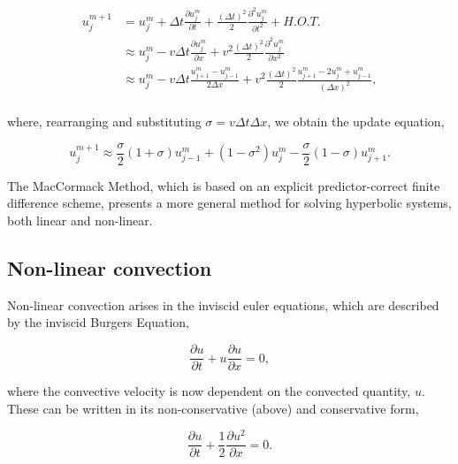 \documentclass[12pt]{article}
\begin{document}
\begin{align*}
u_j^{m+1} &= u_j^m + \Delta t \frac{\partial u_j^m}{\partial t} + \frac{(\Delta t)^2}{2}\frac{\partial^2 u_j^m}{\partial t^2} + H.O.T.\\[1em]
		  &\approx u_j^m - v\Delta t \frac{\partial u_j^m}{\partial x} + v^2\frac{(\Delta t)^2}{2}\frac{\partial^2 u_j^m}{\partial x^2}\\[1em]
		  &\approx u_j^m - v\Delta t \frac{u_{j+1}^m - u_{j-1}^m}{2\Delta x} + v^2\frac{(\Delta t)^2}{2}\frac{u_{j+1}^m - 2u_j^m + u_{j-1}^m}{(\Delta x)^2},\\[1em]
\end{align*}

\vspace{-5mm}

where, rearranging and substituting $\sigma = v \Delta t \Delta x$, we obtain the update equation,

\vspace{2mm}

$$ u_j^{m+1} \approx \frac{\sigma}{2}(1+\sigma)u_{j-1}^m + (1-\sigma^2)u_j^m - \frac{\sigma}{2}(1-\sigma)u_{j+1}^m. $$

\vspace{4mm}

The MacCormack Method, which is based on an explicit predictor-correct finite difference scheme, presents a more general method for solving hyperbolic systems, both linear and non-linear.



\subsection{Non-linear convection}

Non-linear convection arises in the inviscid euler equations, which are described by the inviscid Burgers Equation,

\vspace{2mm}

$$ \frac{\partial u}{\partial t} + u \frac{\partial u}{\partial x} = 0, $$

\vspace{4mm}

where the convective velocity is now dependent on the convected quantity, $u$. These can be written in its non-conservative (above) and conservative form,

\vspace{2mm}

$$ \frac{\partial u}{\partial t} + \frac{1}{2} \frac{\partial u^2}{\partial x} = 0. $$
\end{document}
